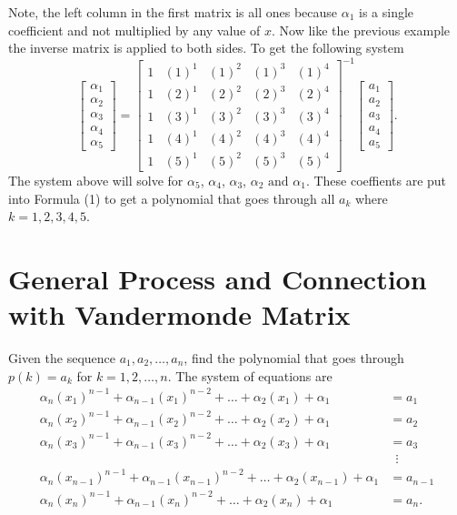 \documentclass[12pt]{amsart}
\begin{document}
Note, the left column in the first matrix is all ones because $\alpha_1$ is a single coefficient and not multiplied by any value of $x$. Now like the previous example the inverse matrix is applied to both sides. To get the following system
\begin{equation*}
\left[ {\begin{array}{c}
\alpha_1 \\
\alpha_2 \\
\alpha_3 \\
\alpha_4 \\
\alpha_5
\end{array} } \right]=
\left[ {\begin{array}{ccccc}
1& (1)^1 & (1)^2 & (1)^3 & (1)^4 \\
1& (2)^1 & (2)^2 & (2)^3 & (2)^4 \\
1& (3)^1 & (3)^2 & (3)^3 & (3)^4 \\
1& (4)^1 & (4)^2 & (4)^3 & (4)^4 \\
1& (5)^1 & (5)^2 & (5)^3 & (5)^4
\end{array} } \right]^{-1}
\left[ {\begin{array}{c}
a_1 \\
a_2 \\
a_3\\
a_4\\
a_5
\end{array} } \right].
\end{equation*}
The system above will solve for $\alpha_5$, $\alpha_4$, $\alpha_3$, $\alpha_2 \text{ and } \alpha_1$. These coeffients are put into Formula (1) to get a polynomial that goes through all $a_k$ where $k=1, 2, 3, 4, 5$.
 
\section{General Process and Connection with Vandermonde Matrix}
Given the sequence $a_1, a_2,\hdots,a_n$, find the polynomial that goes through $p(k)=a_k$ for $k=1, 2,\hdots,n$.
The system of equations are
\begin{align*}
\alpha_{n}(x_1)^{n-1}+\alpha_{n-1}(x_1)^{n-2}+\hdots+\alpha_2(x_1)+\alpha_1&=a_1\\
\alpha_{n}(x_2)^{n-1}+\alpha_{n-1}(x_2)^{n-2}+\hdots+\alpha_2(x_2)+\alpha_1&=a_2\\
\alpha_{n}(x_3)^{n-1}+\alpha_{n-1}(x_3)^{n-2}+\hdots+\alpha_2(x_3)+\alpha_1&=a_3\\
&\,\,\,\vdots\\
\alpha_{n}(x_{n-1})^{n-1}+\alpha_{n-1}(x_{n-1})^{n-2}+\hdots+\alpha_2(x_{n-1})+\alpha_1&=a_{n-1}\\
\alpha_{n}(x_n)^{n-1}+\alpha_{n-1}(x_n)^{n-2}+\hdots+\alpha_2(x_n)+\alpha_1&=a_n.
\end{align*}
 
\end{document}

